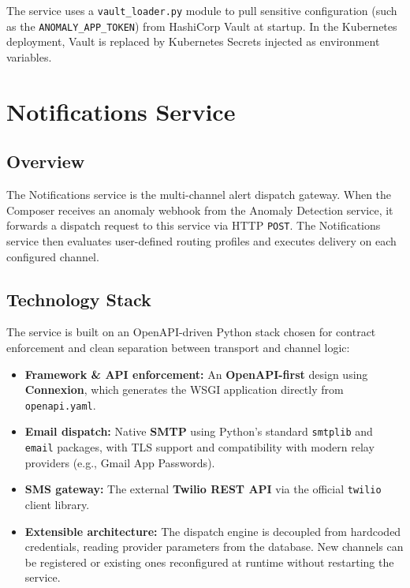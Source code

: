 \documentclass[12pt,a4paper,oneside]{report}
\begin{document}
The service uses a \texttt{vault\_loader.py} module to pull sensitive configuration (such as the \texttt{ANOMALY\_APP\_TOKEN}) from HashiCorp Vault at startup. In the Kubernetes deployment, Vault is replaced by Kubernetes Secrets injected as environment variables.

\chapter{Notifications Service}
\label{ch:notifications}

\section{Overview}
The Notifications service is the multi-channel alert dispatch gateway. When the Composer receives an anomaly webhook from the Anomaly Detection service, it forwards a dispatch request to this service via HTTP \texttt{POST}. The Notifications service then evaluates user-defined routing profiles and executes delivery on each configured channel.

\section{Technology Stack}
The service is built on an OpenAPI-driven Python stack chosen for contract enforcement and clean separation between transport and channel logic:

\begin{itemize}
    \item \textbf{Framework \& API enforcement:} An \textbf{OpenAPI-first} design using \textbf{Connexion}, which generates the WSGI application directly from \texttt{openapi.yaml}.
    \item \textbf{Email dispatch:} Native \textbf{SMTP} using Python's standard \texttt{smtplib} and \texttt{email} packages, with TLS support and compatibility with modern relay providers (e.g., Gmail App Passwords).
    \item \textbf{SMS gateway:} The external \textbf{Twilio REST API} via the official \texttt{twilio} client library.
    \item \textbf{Extensible architecture:} The dispatch engine is decoupled from hardcoded credentials, reading provider parameters from the database. New channels can be registered or existing ones reconfigured at runtime without restarting the service.
\end{itemize}
\end{document}
